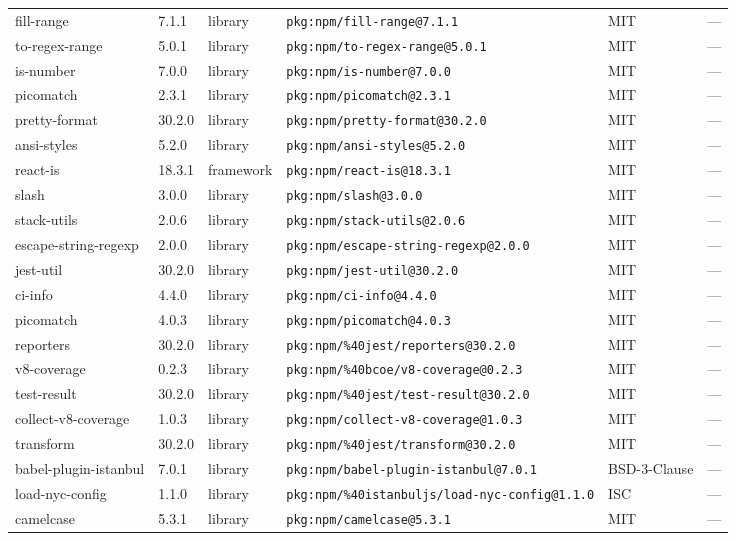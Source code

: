 \documentclass[11pt]{article}
\begin{document}
\begin{longtable}{|l|l|l|p{2.2cm}|l|p{4cm}|}
fill-range & 7.1.1 & library & \texttt{pkg:npm/fill-range@7.1.1} & MIT & — \\
to-regex-range & 5.0.1 & library & \texttt{pkg:npm/to-regex-range@5.0.1} & MIT & — \\
is-number & 7.0.0 & library & \texttt{pkg:npm/is-number@7.0.0} & MIT & — \\
picomatch & 2.3.1 & library & \texttt{pkg:npm/picomatch@2.3.1} & MIT & — \\
pretty-format & 30.2.0 & library & \texttt{pkg:npm/pretty-format@30.2.0} & MIT & — \\
ansi-styles & 5.2.0 & library & \texttt{pkg:npm/ansi-styles@5.2.0} & MIT & — \\
react-is & 18.3.1 & framework & \texttt{pkg:npm/react-is@18.3.1} & MIT & — \\
slash & 3.0.0 & library & \texttt{pkg:npm/slash@3.0.0} & MIT & — \\
stack-utils & 2.0.6 & library & \texttt{pkg:npm/stack-utils@2.0.6} & MIT & — \\
escape-string-regexp & 2.0.0 & library & \texttt{pkg:npm/escape-string-regexp@2.0.0} & MIT & — \\
jest-util & 30.2.0 & library & \texttt{pkg:npm/jest-util@30.2.0} & MIT & — \\
ci-info & 4.4.0 & library & \texttt{pkg:npm/ci-info@4.4.0} & MIT & — \\
picomatch & 4.0.3 & library & \texttt{pkg:npm/picomatch@4.0.3} & MIT & — \\
reporters & 30.2.0 & library & \texttt{pkg:npm/\%40jest/reporters@30.2.0} & MIT & — \\
v8-coverage & 0.2.3 & library & \texttt{pkg:npm/\%40bcoe/v8-coverage@0.2.3} & MIT & — \\
test-result & 30.2.0 & library & \texttt{pkg:npm/\%40jest/test-result@30.2.0} & MIT & — \\
collect-v8-coverage & 1.0.3 & library & \texttt{pkg:npm/collect-v8-coverage@1.0.3} & MIT & — \\
transform & 30.2.0 & library & \texttt{pkg:npm/\%40jest/transform@30.2.0} & MIT & — \\
babel-plugin-istanbul & 7.0.1 & library & \texttt{pkg:npm/babel-plugin-istanbul@7.0.1} & BSD-3-Clause & — \\
load-nyc-config & 1.1.0 & library & \texttt{pkg:npm/\%40istanbuljs/load-nyc-config@1.1.0} & ISC & — \\
camelcase & 5.3.1 & library & \texttt{pkg:npm/camelcase@5.3.1} & MIT & — \\

\end{longtable}
\end{document}
